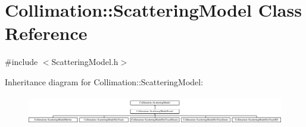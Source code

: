 \hypertarget{classCollimation_1_1ScatteringModel}{}\section{Collimation\+:\+:Scattering\+Model Class Reference}
\label{classCollimation_1_1ScatteringModel}


{\ttfamily \#include $<$Scattering\+Model.\+h$>$}

Inheritance diagram for Collimation\+:\+:Scattering\+Model\+:\begin{figure}[H]
\begin{center}
\leavevmode
\includegraphics[height=1.267925cm]{classCollimation_1_1ScatteringModel}
\end{center}
\end{figure}
